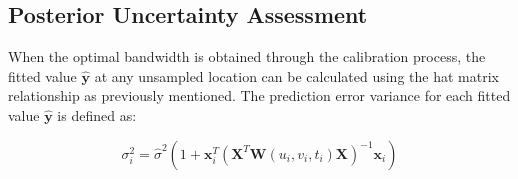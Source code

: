 %


\subsection{Posterior Uncertainty Assessment}

\label{subsec:gtwr_prediction}

When the optimal bandwidth is obtained through the calibration process, the fitted value $\hat{\mathbf{y}}$ at any unsampled location can be calculated using the hat matrix relationship as previously mentioned. The prediction error variance for each fitted value $\hat{\mathbf{y}}$ is defined as:

\begin{equation}
	\sigma_i^2 = \hat{\sigma}^2 \left(1 + \mathbf{x}_i^T (\mathbf{X}^T \mathbf{W}(u_i, v_i, t_i) \mathbf{X})^{-1} \mathbf{x}_i \right)
	\label{eq:gtwr_variance}
\end{equation}

